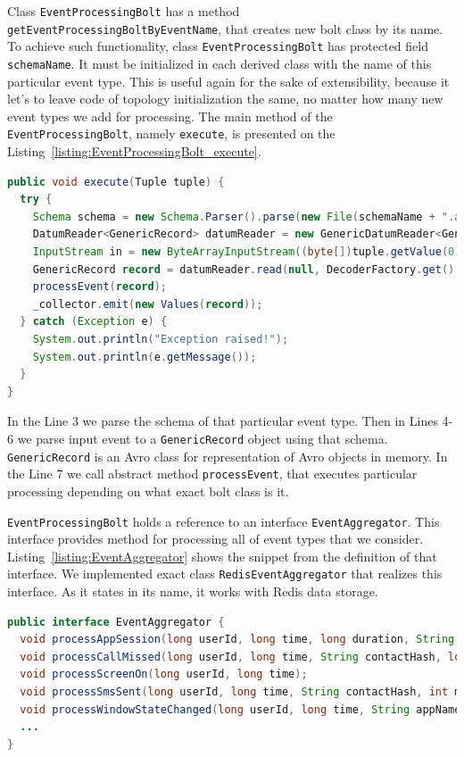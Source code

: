 Class \lstinline{EventProcessingBolt} has a method \lstinline{getEventProcessingBoltByEventName}, that creates new bolt class by its name.
To achieve such functionality, class \lstinline{EventProcessingBolt} has protected field \lstinline{schemaName}.
It must be initialized in each derived class with the name of this particular event type.
This is useful again for the sake of extensibility, because it let's to leave code of topology initialization the same, no matter how many new event types we add for processing.
The main method of the \lstinline{EventProcessingBolt}, namely \lstinline{execute}, is presented on the Listing~\ref{listing:EventProcessingBolt_execute}.

\begin{lstlisting}[float=h, caption=The main method of the EventProcessingBolt., label=listing:EventProcessingBolt_execute, language=Java]
public void execute(Tuple tuple) {
  try {
    Schema schema = new Schema.Parser().parse(new File(schemaName + ".avsc"));
    DatumReader<GenericRecord> datumReader = new GenericDatumReader<GenericRecord>(schema);
    InputStream in = new ByteArrayInputStream((byte[])tuple.getValue(0));
    GenericRecord record = datumReader.read(null, DecoderFactory.get().jsonDecoder(schema, in));
    processEvent(record);
    _collector.emit(new Values(record));
  } catch (Exception e) {
    System.out.println("Exception raised!");
    System.out.println(e.getMessage());
  }
}
\end{lstlisting}

In the Line 3 we parse the schema of that particular event type.
Then in Lines 4-6 we parse input event to a \lstinline{GenericRecord} object using that schema.
\lstinline{GenericRecord} is an Avro class for representation of Avro objects in memory.
In the Line 7 we call abstract method \lstinline{processEvent}, that executes particular processing depending on what exact bolt class is it.

\lstinline{EventProcessingBolt} holds a reference to an interface \lstinline{EventAggregator}.
This interface provides method for processing all of event types that we consider.
Listing~\ref{listing:EventAggregator} shows the snippet from the definition of that interface.
We implemented exact class \lstinline{RedisEventAggregator} that realizes this interface.
As it states in its name, it works with Redis data storage.

\begin{lstlisting}[float=h, caption=The partial listing of the interface EventAggregator., label=listing:EventAggregator, language=Java]
public interface EventAggregator {
  void processAppSession(long userId, long time, long duration, String appName);
  void processCallMissed(long userId, long time, String contactHash, long timestamp);
  void processScreenOn(long userId, long time);
  void processSmsSent(long userId, long time, String contactHash, int msgLength);
  void processWindowStateChanged(long userId, long time, String appName, String windowTitle);
  ...
}
\end{lstlisting}

